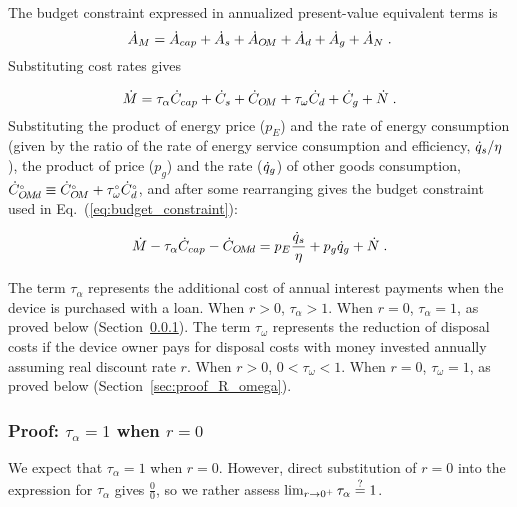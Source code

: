 The budget constraint expressed in annualized present-value equivalent terms is 
%
\begin{equation}
  \dot{A}_M = \dot{A}_{cap} + 
               \dot{A}_s + 
               \dot{A}_{O\!M} + 
               \dot{A}_d + 
               \dot{A}_g + 
               \dot{A}_N \; .
\end{equation}
%
Substituting cost rates gives

\begin{equation}
  \dot{M} = \tau_\alpha \dot{C}_{cap} + 
             \dot{C}_s + 
             \dot{C}_{O\!M} + 
             \tau_\omega \dot{C}_d + 
             \dot{C}_g + 
             \dot{N} \; .
\end{equation}
%
Substituting the product of energy price ($p_E$) and
the rate of energy consumption
(given by the ratio of the rate of energy service consumption
and efficiency, $\dot{q}_s / \eta$),
the product of price ($p_g$) and
the rate ($\dot{q}_g$) of other goods consumption,
${}{\dot{C}}^{\scriptscriptstyle \circ}_{O\!M\!d} \equiv {}{\dot{C}}^{\scriptscriptstyle \circ}_{O\!M} + {}{\tau}^{\scriptscriptstyle \circ}_\omega {}{\dot{C}}^{\scriptscriptstyle \circ}_d$,
and after some rearranging gives the budget constraint
used in Eq.~(\ref{eq:budget_constraint}):

\begin{equation}
  \dot{M} - \tau_\alpha \dot{C}_{cap} - \dot{C}_{O\!M\!d} = p_E \frac{\dot{q}_s}{\eta} + p_g \dot{q}_g + \dot{N} \; .
\end{equation}

The term $\tau_\alpha$ represents the additional cost of annual interest
payments when the device is purchased with a loan.
When $r > 0$, $\tau_\alpha > 1$.
When $r = 0$, $\tau_\alpha = 1$, as proved below
(Section~\ref{sec:proof_R_alpha}).
The term $\tau_\omega$ represents the reduction of disposal costs 
if the device owner pays for disposal costs with money
invested annually assuming real discount rate $r$. 
When $r > 0$, $0 < \tau_\omega < 1$.
When $r = 0$, $\tau_\omega = 1$, as proved below
(Section~\ref{sec:proof_R_omega}).


\subsubsection{Proof: $\tau_\alpha = 1$ when $r = 0$}
\label{sec:proof_R_alpha}

We expect that $\tau_\alpha = 1$ when $r = 0$.
However, direct substitution of $r = 0$ into the expression
for $\tau_\alpha$ gives $\frac{0}{0}$, 
so we rather assess
$\lim_{r \to 0^+} \tau_\alpha \stackrel{?}{=} 1$.

